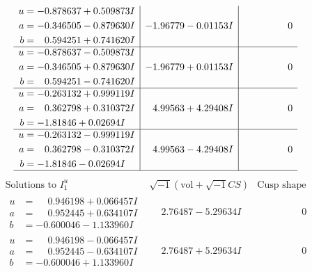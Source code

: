 \documentclass[1p]{elsarticle_modified}
\theoremstyle{definition}
\newcommand{\I}{\sqrt{-1}}
\begin{document}
$$\begin{array}{c|c|c}
\begin{aligned}
u &= -0.878637 + 0.509873 I \\
a &= -0.346505 - 0.879630 I \\
b &= \phantom{-}0.594251 + 0.741620 I\end{aligned}
 & -1.96779 - 0.01153 I & \phantom{-0.000000 } 0 \\ \hline\begin{aligned}
u &= -0.878637 - 0.509873 I \\
a &= -0.346505 + 0.879630 I \\
b &= \phantom{-}0.594251 - 0.741620 I\end{aligned}
 & -1.96779 + 0.01153 I & \phantom{-0.000000 } 0 \\ \hline\begin{aligned}
u &= -0.263132 + 0.999119 I \\
a &= \phantom{-}0.362798 + 0.310372 I \\
b &= -1.81846 + 0.02694 I\end{aligned}
 & \phantom{-}4.99563 + 4.29408 I & \phantom{-0.000000 } 0 \\ \hline\begin{aligned}
u &= -0.263132 - 0.999119 I \\
a &= \phantom{-}0.362798 - 0.310372 I \\
b &= -1.81846 - 0.02694 I\end{aligned}
 & \phantom{-}4.99563 - 4.29408 I & \phantom{-0.000000 } 0\\
 \hline 
 \end{array}$$\newpage$$\begin{array}{c|c|c}  
\text{Solutions to }I^u_{1}& \I (\text{vol} + \sqrt{-1}CS) & \text{Cusp shape}\\
 \hline 
\begin{aligned}
u &= \phantom{-}0.946198 + 0.066457 I \\
a &= \phantom{-}0.952445 + 0.634107 I \\
b &= -0.600046 - 1.133960 I\end{aligned}
 & \phantom{-}2.76487 - 5.29634 I & \phantom{-0.000000 } 0 \\ \hline\begin{aligned}
u &= \phantom{-}0.946198 - 0.066457 I \\
a &= \phantom{-}0.952445 - 0.634107 I \\
b &= -0.600046 + 1.133960 I\end{aligned}
 & \phantom{-}2.76487 + 5.29634 I & \phantom{-0.000000 } 0 \\ \hline\begin{aligned}

\end{aligned}
\end{array}$$
\end{document}
